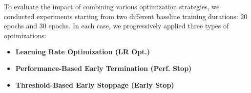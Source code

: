 To evaluate the impact of combining various optimization strategies, we conducted experiments starting from two different baseline training durations: 20 epochs and 30 epochs. In each case, we progressively applied three types of optimizations:
\begin{itemize}
    \item \textbf{Learning Rate Optimization (LR Opt.)}
    \item \textbf{Performance-Based Early Termination (Perf. Stop)}
    \item \textbf{Threshold-Based Early Stoppage (Early Stop)}
\end{itemize}

